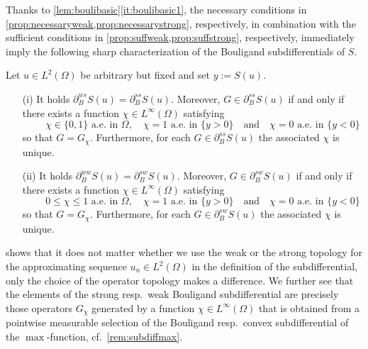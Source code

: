 \documentclass[reqno]{shinyart}
\begin{document}
Thanks to \cref{lem:boulibasic}\ref{it:boulibasic1}, the necessary conditions 
in \cref{prop:necessaryweak,prop:necessarystrong}, respectively, 
in combination with the sufficient conditions 
in \cref{prop:suffweak,prop:suffstrong}, respectively, immediately 
imply the following sharp characterization of the Bouligand 
subdifferentials of $S$.

\begin{theorem}\label{th:endgame}
    Let $u \in L^2(\Omega)$ be arbitrary but fixed and set $y:= S(u)$. 
    \begin{itemize}
        \item[(i)] It holds $\partial_B^{ws} S(u) =  \partial_B^{ss} S(u)$.
            Moreover, $G \in  \partial_{B}^{ss} S(u)$ if and only if there exists a function 
            $\chi \in L^\infty(\Omega)$ satisfying 
            \begin{equation*}
                \qquad \chi \in \{0, 1\} \text{ a.e.\ in }\Omega, \quad \chi = 1 \text{ a.e.\ in } \{y > 0\}
                \quad \text{and} \quad \chi = 0 \text{ a.e.\ in } \{y < 0\}
            \end{equation*}
            so that $G = G_\chi$.
            Furthermore, for each $G \in  \partial_{B}^{ss} S(u)$ the associated $\chi$ is unique. 
        \item[(ii)] It holds $\partial_B^{ww} S(u) =   \partial_B^{sw} S(u)$.
            Moreover, $G \in  \partial_{B}^{sw} S(u)$ if and only if there exists a function 
            $\chi \in L^\infty(\Omega)$ satisfying 
            \begin{equation*}
                \qquad 0 \leq \chi \leq 1 \text{ a.e.\ in }\Omega, \quad \chi = 1 \text{ a.e.\ in } \{y > 0\}
                \quad \text{and} \quad \chi = 0 \text{ a.e.\ in } \{y < 0\}
            \end{equation*}
            so that $G = G_\chi$.
            Furthermore, for each $G \in  \partial_{B}^{sw} S(u)$ the associated $\chi$ is unique. 
    \end{itemize}
\end{theorem}

\begin{remark}\label{rem:subdiffmax2}
     shows that it does not matter whether we use the weak or the 
    strong topology for the approximating sequence $u_n \in L^2(\Omega)$ 
    in the definition of the subdifferential, only the choice of 
    the operator topology makes a difference. 
    We further see that the elements of the strong resp.\ weak Bouligand subdifferential 
    are precisely those operators $G_\chi$ generated by a function $\chi\in L^\infty(\Omega)$ 
    that is obtained from a pointwise measurable selection of the 
    Bouligand resp.\ convex subdifferential of the $\max$-function, 
    cf.~\cref{rem:subdiffmax}.
\end{remark}
\end{document}
